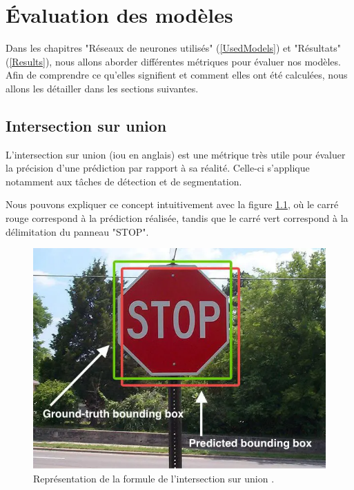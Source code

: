 
\chapter{Évaluation des modèles} %

\label{ModelEvaluation} %


Dans les chapitres "Réseaux de neurones utilisés" (\ref{UsedModels}) et "Résultats" (\ref{Results}), nous allons aborder différentes métriques pour évaluer nos modèles. Afin de comprendre ce qu'elles signifient et comment elles ont été calculées, nous allons les détailler dans les sections suivantes.

\section{Intersection sur union}
\label{sec:iou}

L'intersection sur union (\acrfull{iou} en anglais) \cite{subramanyam_iouintersection_2021} est une métrique très utile pour évaluer la précision d'une prédiction par rapport à sa réalité. Celle-ci s'applique notamment aux tâches de détection et de segmentation.

Nous pouvons expliquer ce concept intuitivement avec la figure \ref{fig:iou_prediction_and_ground_truth}, où le carré rouge correspond à la prédiction réalisée, tandis que le carré vert correspond à la délimitation du panneau "STOP". 

\begin{figure}[hbt!]
    \centering
    \includegraphics[scale=0.5]{Figures/model_evaluation/iou_prediction_and_ground_truth.png}
    \caption{Représentation de la formule de l'intersection sur union \cite{noauthor_jaccard_2023}.}
    \label{fig:iou_prediction_and_ground_truth}
\end{figure}

